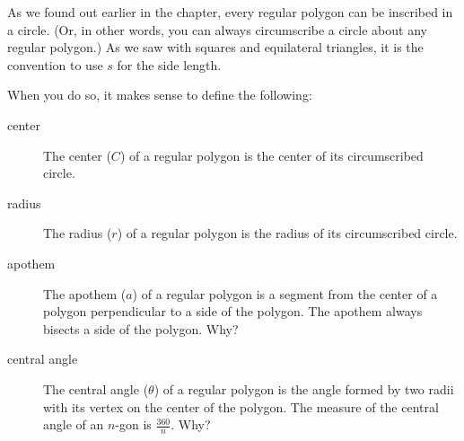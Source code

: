 As we found out earlier in the chapter, every regular polygon can be inscribed
in a circle.  (Or, in other words, you can always circumscribe a circle about
any regular polygon.)  As we saw with squares and equilateral triangles, it is the convention to use $s$ for the side length. 
	\begin{center}
	\hspace*{2cm}
	\end{center}
When you do so, 
it makes sense to define the following:
\begin{description}
\item[center] The center ($C$) of a regular polygon is the center of its circumscribed circle.
\item[radius] The radius ($r$) of a regular polygon is the radius of its circumscribed circle.
\item[apothem] The apothem ($a$) of a regular polygon is a segment from
the center of a polygon perpendicular to a side of the polygon. 
The apothem always bisects a side of the polygon. \q Why?
\medskip
\item[central angle] The central angle ($\theta$) of a regular polygon is the angle formed by two radii with its vertex on the center of the polygon.  The measure of the central angle of an $n$-gon is $\frac{360}{n}$. \q Why?
\end{description}

\medskip
\medskip


